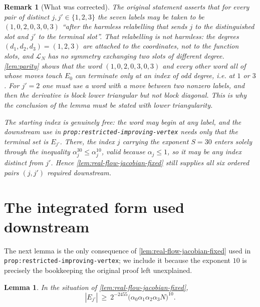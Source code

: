 \documentclass[11pt]{article}
\newtheorem{lemma}[theorem]{Lemma}
\newtheorem{remark}[theorem]{Remark}
\newcommand{\abs}[1]{\left|#1\right|}
\newcommand{\indices}{\{1,2,3\}}
\begin{document}
\begin{remark}[What was corrected]
  \label{rem:statement-correction}
  The original statement asserts that for \emph{every} pair of distinct
  $j,j'\in\indices$ the seven labels may be taken to be $(1,0,2,0,3,0,3)$ ``after
  the harmless relabelling that sends $j$ to the distinguished slot and $j'$ to
  the terminal slot''.  That relabelling is not harmless: the degrees
  $(d_1,d_2,d_3)=(1,2,3)$ are attached to the coordinates, not to the function
  slots, and $\mathcal L_N$ has no symmetry exchanging two slots of different
  degree.  \cref{lem:parity} shows that the word $(1,0,2,0,3,0,3)$ and every other
  word all of whose moves touch $E_0$ can terminate only at an index of odd
  degree, i.e. at $1$ or $3$.  For $j'=2$ one must use a word with a move between
  two nonzero labels, and then the derivative is block lower triangular but not
  block diagonal.  This is why the conclusion of the lemma must be stated with
  lower triangularity.

  The starting index is genuinely free: the word may begin at any label, and the
  downstream use in \texttt{prop:restricted-improving-vertex} needs only that the
  \emph{terminal} set is $E_{j'}$.  There, the index $j$ carrying the exponent
  $S=30$ enters solely through the inequality $\alpha_j^{30}\leq\alpha_j^{10}$,
  valid because $\alpha_j\leq1$, so it may be any index distinct from $j'$.  Hence
  \cref{lem:real-flow-jacobian-fixed} still supplies all six ordered pairs
  $(j,j')$ required downstream.
\end{remark}

\section{The integrated form used downstream}
\label{sec:integrated}

The next lemma is the only consequence of
\cref{lem:real-flow-jacobian-fixed} used in
\texttt{prop:restricted-improving-vertex}; we include it because the exponent
$10$ is precisely the bookkeeping the original proof left unexplained.

\begin{lemma}
  \label{lem:integrated}
  In the situation of \cref{lem:real-flow-jacobian-fixed},
  \[
    \abs{E_{j'}}\ \geq\ 2^{-2455}\bigl(\alpha_0\alpha_1\alpha_2\alpha_3N\bigr)^{10}.
  \]
\end{lemma}
\end{document}
